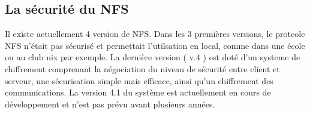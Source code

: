 \subsection{La sécurité du NFS}
Il existe actuellement 4 version de NFS. Dans les 3 premières versions, le protcole NFS n'était pas sécurisé et permettait l'utilsation en local, comme dans une école ou au club nix par exemple. La dernière version ( v.4 ) est doté d'un systeme de chiffrement comprenant la négociation du niveau de sécurité entre client et serveur, une sécurisation simple mais efficace, ainsi qu'un chiffrement des communications.
La version 4.1 du système est actuellement en cours de développement et n'est pas prévu avant plusieurs années.
